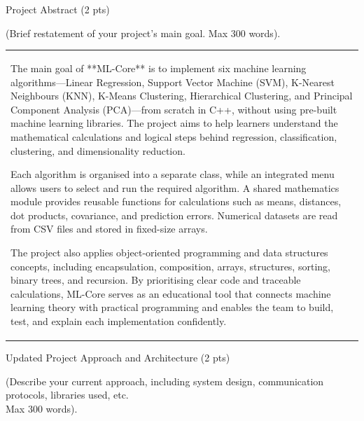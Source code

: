 \documentclass[12pt,a4paper]{article}
\newcommand{\sectiontitle}[1]{%
    {\color{GEUBlue}
    \fontsize{18}{22}\selectfont #1}
}
\newcommand{\instruction}[1]{%
    {\color{InstructionGrey}
    \fontsize{10.5}{13}\selectfont #1}
}
\newcommand{\answerbox}[2]{%
    \begin{tabularx}{\textwidth}{
        |>{\raggedright\arraybackslash}X|}
        \hline
        \parbox[t][#1][t]{\dimexpr\linewidth-12pt\relax}{
            \vspace{5pt}
            \fontsize{11}{13}\selectfont #2
        }\\
        \hline
    \end{tabularx}
}
\begin{document}
\sectiontitle{Project Abstract (2 pts)}

\vspace{0.05cm}

\instruction{
(Brief restatement of your project's main goal. Max 300 words).
}

\vspace{0.12cm}

\answerbox{6cm}{The main goal of **ML-Core** is to implement six machine learning algorithms—Linear Regression, Support Vector Machine (SVM), K-Nearest Neighbours (KNN), K-Means Clustering, Hierarchical Clustering, and Principal Component Analysis (PCA)—from scratch in C++, without using pre-built machine learning libraries. The project aims to help learners understand the mathematical calculations and logical steps behind regression, classification, clustering, and dimensionality reduction.

Each algorithm is organised into a separate class, while an integrated menu allows users to select and run the required algorithm. A shared mathematics module provides reusable functions for calculations such as means, distances, dot products, covariance, and prediction errors. Numerical datasets are read from CSV files and stored in fixed-size arrays.

The project also applies object-oriented programming and data structures concepts, including encapsulation, composition, arrays, structures, sorting, binary trees, and recursion. By prioritising clear code and traceable calculations, ML-Core serves as an educational tool that connects machine learning theory with practical programming and enables the team to build, test, and explain each implementation confidently.}

\vspace{0.70cm}

\sectiontitle{Updated Project Approach and Architecture (2 pts)}

\vspace{0.05cm}

\instruction{
(Describe your current approach, including system design,
communication protocols, libraries used, etc.\\
Max 300 words).
}

\vspace{0.25cm}
\end{document}
